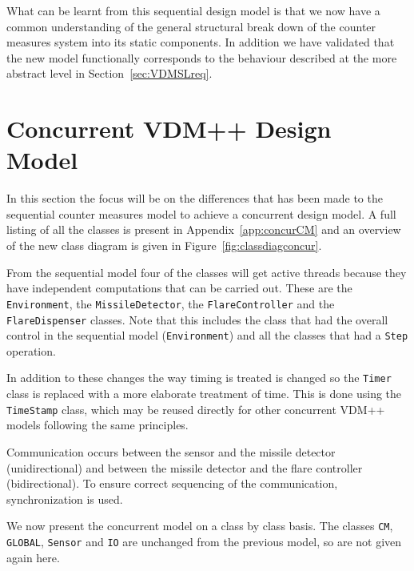 \documentclass{overturerepchap}
\begin{document}
What can be learnt from this sequential design model is
that we now have a common understanding of the general structural
break down of the counter measures system into its static
components. In addition we have validated that the new model
functionally corresponds to the behaviour described at the more
abstract level in Section~\ref{sec:VDMSLreq}. 

\section{Concurrent VDM++ Design Model}\label{sec:concurmod}

In this section the focus will be on the differences that has been
made to the sequential counter measures model to achieve a concurrent
design model. A full listing of all the classes is present in 
Appendix~\ref{app:concurCM} and an overview of the new class diagram
is given in Figure~\ref{fig:classdiagconcur}.

From the sequential model four of the classes will get active threads
because they have independent computations that can be carried
out. These are the \texttt{Environment}, the
\texttt{Missile\-Detector}, the \texttt{FlareController} and the
\texttt{FlareDispenser} classes. Note that this includes the class 
that had the overall control in the sequential model (\texttt{Environment}) 
and all the classes that had a \texttt{Step} operation.

In addition to these changes the way timing is treated is changed so
the \texttt{Timer} class is replaced with a more elaborate treatment
of time. This is done using the
\texttt{TimeStamp} class, which may be reused directly for other 
concurrent VDM++ models following the same principles.

Communication occurs between the sensor and the missile detector
(unidirectional) and between the missile detector and the flare
controller (bidirectional). To ensure correct sequencing of the
communication, synchronization is used.

We now present the concurrent model on a class by class basis. The
classes \texttt{CM}, \texttt{GLOBAL}, \texttt{Sensor} and \texttt{IO} 
are unchanged from the
previous model, so are not given again here.
\end{document}
